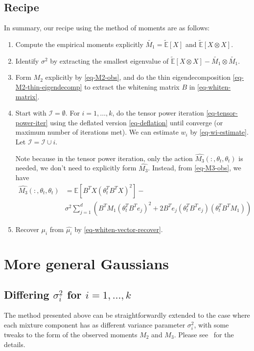 \documentclass{article}
\begin{document}
\subsection{Recipe}
In summary, our recipe using the method of moments are as follows:
\begin{enumerate}
\item Compute the empirical moments explicitly $\widetilde{M_1}=\widetilde{\mathbb{E}}[X]$ and $\widetilde{\mathbb{E}}[X\otimes X]$.
\item Identify $\sigma^2$ by extracting the smallest eigenvalue of $\widetilde{\mathbb{E}}[X\otimes X]-\widetilde{M_1}\otimes \widetilde{M_1}$.
\item Form $M_2$ explicitly by \eqref{eq-M2-obs}, and do the thin eigendecomposition \eqref{eq-M2-thin-eigendecomp} to extract the whitening matrix $B$ in \eqref{eq-whiten-matrix}.
\item Start with $\mathcal{I}=\emptyset$. For $i=1,\ldots,k$, do the tensor power iteration \eqref{eq-tensor-power-iter} using the deflated version \eqref{eq-deflation} until converge (or maximum number of iterations met). We can estimate $w_i$ by \eqref{eq-wi-estimate}. Let $\mathcal{I}=\mathcal{I}\cup {i}$. 
\par
Note because in the tensor power iteration, only the action $\widehat{M_3}(:,\theta_{t}, \theta_{t})$ is needed, we don't need to explicitly form $\widehat{M_3}$. Instead, from \eqref{eq-M3-obs}, we have
\begin{align}
\widehat{M_3}(:,\theta_{t}, \theta_{t}) &= \mathbb{E}[B^{T}X (\theta_t^{T}B^{T}X)^2] -\\
\nonumber
& \sigma^2\sum_{j=1}^d  \left(B^{T}M_1 (\theta_t^{T}B^{T}e_j)^2  +  2 B^{T}e_j (\theta_t^{T}B^{T}e_j)(\theta_t^{T}B^{T}M_1) \right)
\end{align}
\item Recover $\mu_i$ from $\widehat{\mu_i}$ by \eqref{eq-whiten-vector-recover}.
\end{enumerate}
\section{More general Gaussians}
\subsection{Differing $\sigma_i^2$ for $i=1,\ldots,k$}
The method presented above can be straightforwardly extended to the case where each mixture component has as different variance parameter $\sigma_i^2$, with some tweaks to the form of the observed moments $M_2$ and $M_3$. Please see~\cite{HsuK2013} for the details.
\end{document}
